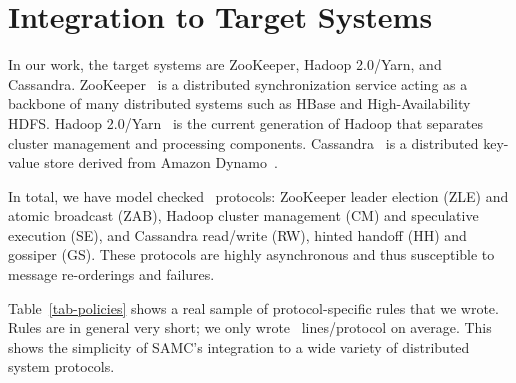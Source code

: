 

\vten %

\section{Integration to Target Systems}
\label{imp-targets}


In our work, the target systems are ZooKeeper, Hadoop 2.0/Yarn, and
Cassandra.  ZooKeeper~\cite{Hunt+10-ZooKeeperPaper} is a distributed
synchronization service acting as a backbone of many distributed systems
such as HBase and High-Availability HDFS.  Hadoop
2.0/Yarn~\cite{Kumar+13-Yarn} is the current generation of Hadoop that
separates cluster management and processing components.
Cassandra~\cite{Lakshman+09-Cassandra} is a distributed key-value store
derived from Amazon Dynamo~\cite{DeCandia+07-Dynamo}.

In total, we have model checked \numProtocols\ protocols: ZooKeeper
leader election (ZLE) and atomic broadcast (ZAB), Hadoop cluster
management (CM) and speculative execution (SE), and Cassandra
read/write (RW), hinted handoff (HH) and gossiper (GS).  These
protocols are highly asynchronous and thus susceptible to message
re-orderings and failures.

Table~\ref{tab-policies} shows a real sample of protocol-specific
rules that we wrote.  Rules are in general very short; we only wrote
\numLinesRule\ lines/protocol on average.  This shows the simplicity
of SAMC's integration to a wide variety of distributed system protocols.



